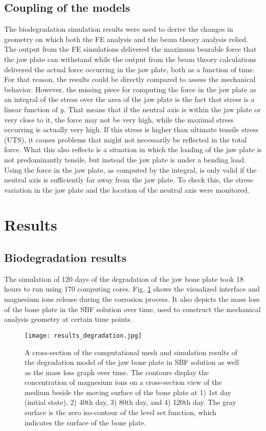\subsection{Coupling of the models}

The biodegradation simulation results were used to derive the changes in geometry on which both the FE analysis and the beam theory analysis relied. The output from the FE simulations delivered the maximum bearable force that the jaw plate can withstand while the output from the beam theory calculations delivered the actual force occurring in the jaw plate, both as a function of time. For that reason, the results could be directly compared to assess the mechanical behavior. However, the missing piece for computing the force in the jaw plate as an integral of the stress over the area of the jaw plate is the fact that stress is a linear function of $y$. That means that if the neutral axis is within the jaw plate or very close to it, the force may not be very high, while the maximal stress occurring is actually very high. If this stress is higher than ultimate tensile stress (UTS), it causes problems that might not necessarily be reflected in the total force. What this also reflects is a situation in which the loading of the jaw plate is not predominantly tensile, but instead the jaw plate is under a bending load. Using the force in the jaw plate, as computed by the integral, is only valid if the neutral axis is sufficiently far away from the jaw plate. To check this, the stress variation in the jaw plate and the location of the neutral axis were monitored.

\section{Results}
\label{sec:results}

\subsection{Biodegradation results}

The simulation of 120 days of the degradation of the jaw bone plate took 18 hours to run using 170 computing cores. Fig. \ref{fig:results_degradation} shows the visualized interface and magnesium ions release during the corrosion process. It also depicts the mass loss of the bone plate in the SBF solution over time, used to construct the mechanical analysis geometry at certain time points.

\begin{figure}[t]
\center \texttt{[image: results\_degradation.jpg]}
\caption{A cross-section of the computational mesh and simulation results of the degradation model of the jaw bone plate in SBF solution as well as the mass loss graph over time. The contours display the concentration of magnesium ions on a cross-section view of the medium beside the moving surface of the bone plate at 1) 1st day (initial state), 2) 40th day, 3) 80th day, and 4) 120th day. The gray surface is the zero iso-contour of the level set function, which indicates the surface of the bone plate.} \label{fig:results_degradation}
\end{figure} 

